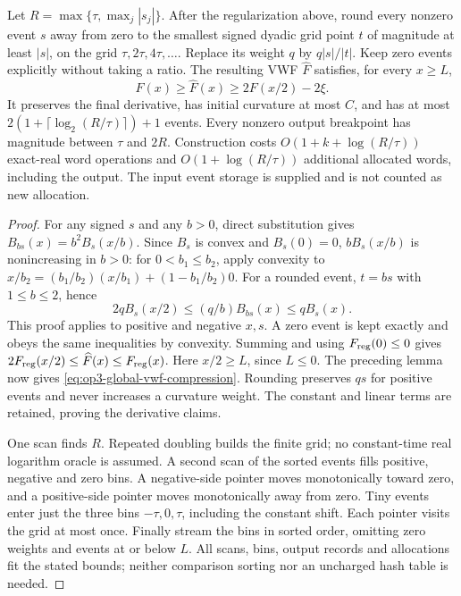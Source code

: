 \begin{theorem}
\label{thm:op3-global-vwf-compression}
Let $R=\max\{\tau,\max_j|s_j|\}$. After the regularization above, round
every nonzero event $s$ away from zero to the smallest signed dyadic grid
point $t$ of magnitude at least $|s|$, on the grid
$\tau,2\tau,4\tau,\ldots$. Replace its weight $q$ by $q|s|/|t|$.
Keep zero events explicitly without taking a ratio. The resulting VWF
$\widehat F$ satisfies, for every $x\geq L$,
\begin{equation}
 F(x)\geq\widehat F(x)\geq2F(x/2)-2\xi.
 \label{eq:op3-global-vwf-compression}
\end{equation}
It preserves the final derivative, has initial curvature at most $C$, and
has at most $2(1+\lceil\log_2(R/\tau)\rceil)+1$ events. Every nonzero
output breakpoint has magnitude between $\tau$ and $2R$.
Construction costs $O(1+k+\log(R/\tau))$ exact-real word operations and
$O(1+\log(R/\tau))$ additional allocated words, including the output.
The input event storage is supplied and is not counted as new allocation.
\end{theorem}
\begin{proof}
For any signed $s$ and any $b>0$, direct substitution gives
$B_{bs}(x)=b^2B_s(x/b)$. Since $B_s$ is convex and $B_s(0)=0$,
$bB_s(x/b)$ is nonincreasing in $b>0$: for $0<b_1\leq b_2$, apply
convexity to $x/b_2=(b_1/b_2)(x/b_1)+(1-b_1/b_2)0$.
For a rounded event, $t=bs$ with $1\leq b\leq2$, hence
\[
 2qB_s(x/2)\leq (q/b)B_{bs}(x)\leq qB_s(x).
\]
This proof applies to positive and negative $x,s$. A zero event is kept
exactly and obeys the same inequalities by convexity. Summing and using
$F_{\rm reg}(0)\leq0$ gives
$2F_{\rm reg}(x/2)\leq\widehat F(x)\leq F_{\rm reg}(x)$.
Here $x/2\geq L$, since $L\leq0$. The preceding lemma now gives
\eqref{eq:op3-global-vwf-compression}. Rounding preserves $qs$ for positive
events and never increases a curvature weight. The constant and linear
terms are retained, proving the derivative claims.

One scan finds $R$. Repeated doubling builds the finite grid; no constant-time
real logarithm oracle is assumed. A second scan of the sorted events fills
positive, negative and zero bins. A negative-side pointer moves monotonically
toward zero, and a positive-side pointer moves monotonically away from zero.
Tiny events enter just the three bins $-\tau,0,\tau$, including the constant
shift. Each pointer visits the grid at most once. Finally stream the bins
in sorted order, omitting zero weights and events at or below $L$.
All scans, bins, output records and allocations fit the stated bounds;
neither comparison sorting nor an uncharged hash table is needed.
\end{proof}

